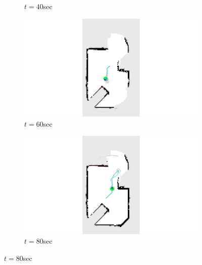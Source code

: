 \documentclass[smallextended]{svjour3}       %
\begin{document}
\begin{figure}
{\begin{subfigure}[b]{0.19\textwidth}
        		\caption{$t=40$sec}
        		\label{fig:Experiment_ogm_t1}
    	\end{subfigure}
	\begin{subfigure}[b]{0.19\textwidth}
        		\includegraphics[trim={13cm 1cm 13cm 0}, clip, width=\textwidth]{feb23_t60sec.jpg}
        		\caption{$t=60$sec}
        		\label{fig:Experiment_ogm_t1p5}
    	\end{subfigure}
	\begin{subfigure}[b]{0.19\textwidth}
        		\includegraphics[trim={13cm 1cm 13cm 0}, clip, width=\textwidth]{feb23_t80sec.jpg}
        		\caption{$t=80$sec}
        		\label{fig:Experiment_ogm_t2}
    	\end{subfigure}
		\vspace*{0.05\textwidth}

}
\end{figure}
\end{document}
